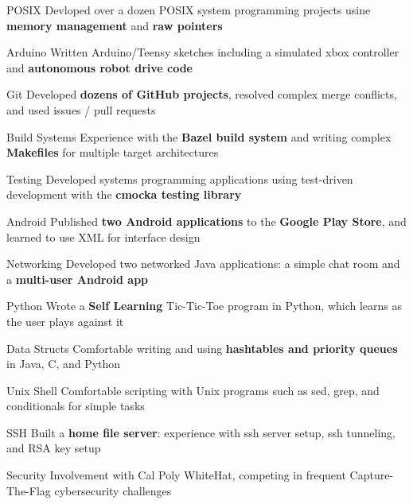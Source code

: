 \begin{cvskills}

 \cvskill
    {POSIX} %
    {Devloped over a dozen POSIX system programming projects usine \textbf{memory management} and \textbf{raw pointers}}%

 \cvskill
    {Arduino} %
    {Written Arduino/Teensy sketches including a simulated xbox controller and \textbf{autonomous robot drive code}} %

 \cvskill
    {Git} %
    {Developed \textbf{dozens of GitHub projects}, resolved complex merge conflicts, and used issues / pull requests} %

 \cvskill
    {Build Systems} %
    {Experience with the \textbf{Bazel build system} and writing complex \textbf{Makefiles} for multiple target architectures} %

 \cvskill
    {Testing} %
    {Developed systems programming applications using test-driven development with the \textbf{cmocka testing library}} %
    
 \cvskill
    {Android} %
    {Published \textbf{two Android applications} to the \textbf{Google Play Store}, and learned to use XML for interface design} %

 \cvskill
    {Networking} %
    {Developed two networked Java applications: a simple chat room and a \textbf{multi-user Android app}} %
 
 \cvskill
    {Python} %
    {Wrote a \textbf{Self Learning} Tic-Tic-Toe program in Python, which learns as the user plays against it} %

 \cvskill
    {Data Structs} %
    {Comfortable writing and using \textbf{hashtables and priority queues} in Java, C, and Python} %

 \cvskill
    {Unix Shell} %
    {Comfortable scripting with Unix programs such as sed, grep, and conditionals for simple tasks} %

 \cvskill
    {SSH} %
    {Built a \textbf{home file server}: experience with ssh server setup, ssh tunneling, and RSA key setup} %

 \cvskill
    {Security} %
    {Involvement with Cal Poly WhiteHat, competing in frequent Capture-The-Flag cybersecurity challenges} %


\end{cvskills}

